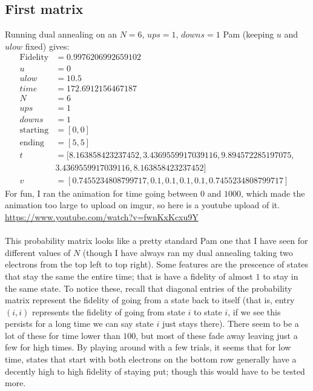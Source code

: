 \subsection{First matrix}
Running dual annealing on an $N=6$, $ups=1$, $downs=1$ Pam (keeping $u$ and $ulow$ fixed) gives:
\begin{align*}
    \text{Fidelity} &= 0.9976206992659102 \\
    u &= 0 \\
    ulow &= 10.5 \\
    time &= 172.6912156467187 \\
    N &= 6 \\
    ups &= 1 \\
    downs &= 1 \\
    \text{starting} &= [0,0] \\
    \text{ending} &= [5,5] \\
    t &= [8.163858423237452,3.4369559917039116,9.894572285197075, \\
    &3.4369559917039116,8.163858423237452] \\
    v &= [0.7455234808799717,0.1,0.1,0.1,0.1,0.7455234808799717]
\end{align*}
For fun, I ran the animation for time going between $0$ and $1000$, which made the animation too large to upload on imgur, so here is a youtube upload of it.
\url{https://www.youtube.com/watch?v=fwnKxKcxu9Y} \\
\\
This probability matrix looks like a pretty standard Pam one that I have seen for different values of $N$ (though I have always ran my dual annealing taking two electrons from the top left to top right).
Some features are the prescence of states that stay the same the entire time; that is have a fidelity of almost $1$ to stay in the same state.
To notice these, recall that diagonal entries of the probability matrix represent the fidelity of going from a state back to itself (that is, entry $(i,i)$ represents the fidelity of going from state $i$ to state $i$, if we see this persists for a long time we can say state $i$ just stays there).
There seem to be a lot of these for time lower than $100$, but most of these fade away leaving just a few for high times.
By playing around with a few trials, it seems that for low time, states that start with both electrons on the bottom row generally have a decently high to high fidelity of staying put; though this would have to be tested more.

